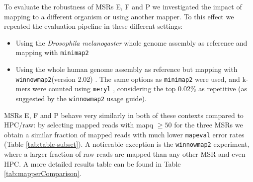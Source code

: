 \documentclass[
  11,
]{scrbook}
\begin{document}
To evaluate the robustness of MSRs E, F and P we investigated the impact
of mapping to a different organism or using another mapper. To this
effect we repeated the evaluation pipeline in these different settings:

\begin{itemize}
\item
  Using the \emph{Drosophila melanogaster} whole genome assembly as
  reference and mapping with \texttt{minimap2}
\item
  Using the whole human genome assembly as reference but mapping with
  \texttt{winnowmap2}(version 2.02) \autocite{jainWeightedMinimizerSampling2020}. The
  same options as \texttt{minimap2} were used, and k-mers were counted using
  \texttt{meryl} \autocite{rhieMerquryReferencefreeQuality2020}, considering the top
  \(0.02\%\) as repetitive (as suggested by the \texttt{winnowmap2} usage
  guide).
\end{itemize}

MSRs E, F and P behave very similarly in both of these contexts compared
to HPC/raw: by selecting mapped reads with mapq \(\geq 50\) for the three
MSRs we obtain a similar fraction of mapped reads with much lower
\texttt{mapeval} error rates (Table \ref{tab:table-subset}). A noticeable exception is the
\texttt{winnowmap2} experiment, where a larger fraction of raw reads are mapped
than any other MSR and even HPC. A more detailed results table can be
found in Table \ref{tab:mapperComparison}.
\end{document}
